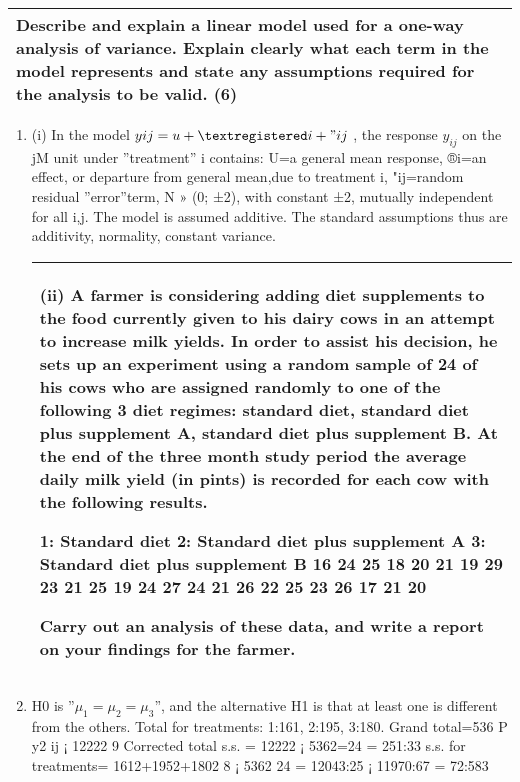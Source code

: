 \documentclass[a4paper,12pt]{article}
\begin{document}
  \begin{table}[ht!]
     \centering
     \begin{tabular}{|p{15cm}|}
     \hline        
Describe and explain a linear model used for a one-way analysis of variance.  Explain clearly what each term in the model represents and state any assumptions required for the analysis to be valid. (6) 
 

 
 \\ \hline
      \end{tabular}
    \end{table}
    

        

\begin{enumerate}
\item (i) In the model $yij = u + ®i + "ij$ , the response $y_{ij}$ on the jM unit under ”treatment” i
contains:
U=a general mean response,
®i=an effect, or departure from general mean,due to treatment i,
"ij=random residual ”error”term, N » (0; ±2), with constant ±2, mutually independent
for all i,j.
The model is assumed additive. The standard assumptions thus are additivity, normality,
constant variance.



\newpage


  \begin{table}[ht!]
     \centering
     \begin{tabular}{|p{15cm}|}
     \hline  
 (ii) A farmer is considering adding diet supplements to the food currently given to his dairy cows in an attempt to increase milk yields.  In order to assist his decision, he sets up an experiment using a random sample of 24 of his cows who are assigned randomly to one of the following 3 diet regimes: standard diet, standard diet plus supplement A, standard diet plus supplement B.  At the end of the three month study period the average daily milk yield (in pints) is recorded for each cow with the following results. 
 
  
1:  Standard diet 
2:  Standard diet plus supplement A 
3:  Standard diet plus supplement B 16 24 25 18 20 21 19 29 23 21 25 19 24 27 24 21 26 22 25 23 26 17 21 20 
 
 
Carry out an analysis of these data, and write a report on your findings for the farmer.  
\\ \hline 
\end{tabular}
\end{table}
\item H0 is ”$\mu_1 = \mu_2 = \mu_3$”, and the alternative H1 is that at least one is different from the
others.
Total for treatments: 1:161, 2:195, 3:180. Grand total=536
P
y2
ij ¡ 12222
9
Corrected total s.s. = 12222 ¡ 5362=24 = 251:33 s.s. for treatments= 1612+1952+1802
8 ¡
5362
24 = 12043:25 ¡ 11970:67 = 72:583


\end{enumerate}
\end{document}
